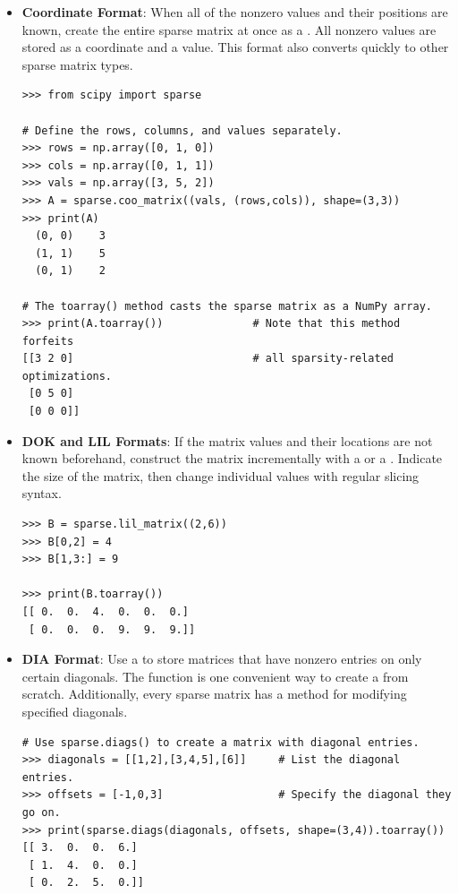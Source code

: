 \begin{itemize} %

\item \textbf{Coordinate Format}:
When all of the nonzero values and their positions are known, create the entire sparse matrix at once as a .
All nonzero values are stored as a coordinate and a value.
This format also converts quickly to other sparse matrix types.

\begin{lstlisting}
>>> from scipy import sparse

# Define the rows, columns, and values separately.
>>> rows = np.array([0, 1, 0])
>>> cols = np.array([0, 1, 1])
>>> vals = np.array([3, 5, 2])
>>> A = sparse.coo_matrix((vals, (rows,cols)), shape=(3,3))
>>> print(A)
  (0, 0)    3
  (1, 1)    5
  (0, 1)    2

# The toarray() method casts the sparse matrix as a NumPy array.
>>> print(A.toarray())              # Note that this method forfeits
[[3 2 0]                            # all sparsity-related optimizations.
 [0 5 0]
 [0 0 0]]
\end{lstlisting}

\item \textbf{DOK and LIL Formats}:
If the matrix values and their locations are not known beforehand, construct the matrix incrementally with a  or a .
Indicate the size of the matrix, then change individual values with regular slicing syntax.

\begin{lstlisting}
>>> B = sparse.lil_matrix((2,6))
>>> B[0,2] = 4
>>> B[1,3:] = 9

>>> print(B.toarray())
[[ 0.  0.  4.  0.  0.  0.]
 [ 0.  0.  0.  9.  9.  9.]]
\end{lstlisting}

\item \textbf{DIA Format}: Use a  to store matrices that have nonzero entries on only certain diagonals.
The function  is one convenient way to create a  from scratch.
Additionally, every sparse matrix has a  method for modifying specified diagonals.
\begin{lstlisting}
# Use sparse.diags() to create a matrix with diagonal entries.
>>> diagonals = [[1,2],[3,4,5],[6]]     # List the diagonal entries.
>>> offsets = [-1,0,3]                  # Specify the diagonal they go on.
>>> print(sparse.diags(diagonals, offsets, shape=(3,4)).toarray())
[[ 3.  0.  0.  6.]
 [ 1.  4.  0.  0.]
 [ 0.  2.  5.  0.]]


\end{lstlisting}
\end{itemize}
